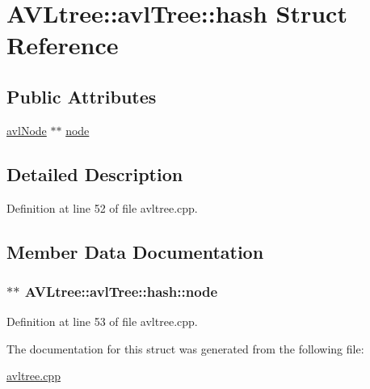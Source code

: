 \hypertarget{struct_a_v_ltree_1_1avl_tree_1_1hash}{\section{A\-V\-Ltree\-:\-:avl\-Tree\-:\-:hash Struct Reference}
\label{struct_a_v_ltree_1_1avl_tree_1_1hash}
}
\subsection*{Public Attributes}
\begin{DoxyCompactItemize}
\item 
\hyperlink{namespace_a_v_ltree_a563d9b152f0d58a69308eeec8d716882}{avl\-Node} $\ast$$\ast$ \hyperlink{struct_a_v_ltree_1_1avl_tree_1_1hash_a5279ec466289b6adf5f56fc15548e599}{node}
\end{DoxyCompactItemize}


\subsection{Detailed Description}


Definition at line 52 of file avltree.\-cpp.



\subsection{Member Data Documentation}
\hypertarget{struct_a_v_ltree_1_1avl_tree_1_1hash_a5279ec466289b6adf5f56fc15548e599}{
\subsubsection[{node}]{$\ast$$\ast$ A\-V\-Ltree\-::avl\-Tree\-::hash\-::node}}\label{struct_a_v_ltree_1_1avl_tree_1_1hash_a5279ec466289b6adf5f56fc15548e599}


Definition at line 53 of file avltree.\-cpp.



The documentation for this struct was generated from the following file\-:\begin{DoxyCompactItemize}
\item 
\hyperlink{avltree_8cpp}{avltree.\-cpp}\end{DoxyCompactItemize}
